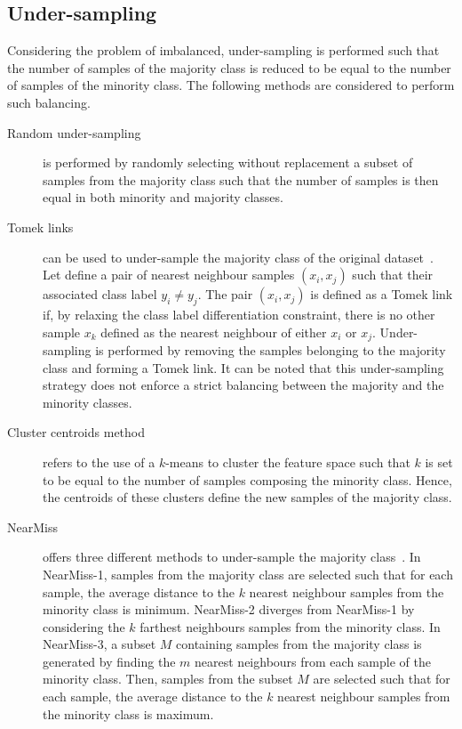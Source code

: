 \documentclass[twoside,11pt]{article}
\begin{document}
\subsection{Under-sampling}

Considering the problem of imbalanced, under-sampling is performed such that the number of samples of the majority class is reduced to be equal to the number of samples of the minority class.
The following methods are considered to perform such balancing.

\begin{description}
  \item[Random under-sampling] is performed by randomly selecting without replacement a subset of samples from the majority class such that the number of samples is then equal in both minority and majority classes.
  \item[Tomek links] can be used to under-sample the majority class of the original dataset~\cite{tomek1976two}.
Let define a pair of nearest neighbour samples $(x_i, x_j)$ such that their associated class label $y_i \neq y_j$.
The pair $(x_i, x_j)$ is defined as a Tomek link if, by relaxing the class label differentiation constraint, there is no other sample $x_k$ defined as the nearest neighbour of either $x_i$ or $x_j$.
Under-sampling is performed by removing the samples belonging to the majority class and forming a Tomek link.
It can be noted that this under-sampling strategy does not enforce a strict balancing between the majority and the minority classes.
  \item[Cluster centroids method] refers to the use of a $k$-means to cluster the feature space such that $k$ is set to be equal to the number of samples composing the minority class.
Hence, the centroids of these clusters define the new samples of the majority class. 
  \item[NearMiss] offers three different methods to under-sample the majority class~\cite{mani2003knn}.
In NearMiss-1, samples from the majority class are selected such that for each sample, the average distance to the $k$ nearest neighbour samples from the minority class is minimum.
NearMiss-2 diverges from NearMiss-1 by considering the $k$ farthest neighbours samples from the minority class.
In NearMiss-3, a subset $M$ containing samples from the majority class is generated by finding the $m$ nearest neighbours from each sample of the minority class.
Then, samples from the subset $M$ are selected such that for each sample, the average distance to the $k$ nearest neighbour samples from the minority class is maximum.

\end{description}
\end{document}
